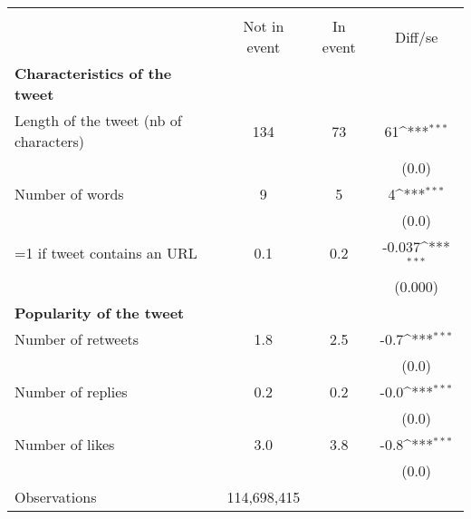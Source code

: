{
\def\sym#1{\ifmmode^{#1}\else\(^{#1}\)\fi}
\begin{tabular}{l*{1}{ccc}}
\hline\hline
                    &\multicolumn{3}{c}{ }                          \\
                    &Not in event&    In event&     Diff/se         \\
\hline
\textbf{Characteristics of the tweet}&            &            &                     \\
Length of the tweet (nb of characters)&         134&          73&          61\sym{***}\\
                    &            &            &       (0.0)         \\
Number of words     &           9&           5&           4\sym{***}\\
                    &            &            &       (0.0)         \\
=1 if tweet contains an URL&         0.1&         0.2&      -0.037\sym{***}\\
                    &            &            &     (0.000)         \\
\textbf{Popularity of the tweet}&            &            &                     \\
Number of retweets  &         1.8&         2.5&        -0.7\sym{***}\\
                    &            &            &       (0.0)         \\
Number of replies   &         0.2&         0.2&        -0.0\sym{***}\\
                    &            &            &       (0.0)         \\
Number of likes     &         3.0&         3.8&        -0.8\sym{***}\\
                    &            &            &       (0.0)         \\
\hline
Observations        & 114,698,415&            &                     \\
\hline\hline
\end{tabular}
}
